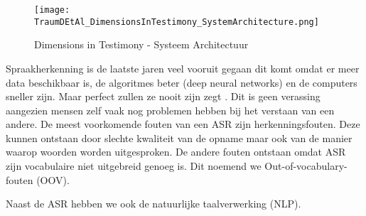 \begin{figure}[h]
    \texttt{[image: TraumDEtAl\_DimensionsInTestimony\_SystemArchitecture.png]}
    \caption{Dimensions in Testimony - Systeem Architectuur \autocite{Traum2015}}
    \label{fig:DiTArchitecture}
\end{figure}

Spraakherkenning is de laatste jaren veel vooruit gegaan dit komt omdat er meer data beschikbaar is, de algoritmes beter (deep neural networks) en de computers sneller zijn. Maar perfect zullen ze nooit zijn zegt \textcite{Hessen2020}. Dit is geen verassing aangezien mensen zelf vaak nog problemen hebben bij het verstaan van een andere. De meest voorkomende fouten van een ASR zijn herkenningsfouten. Deze kunnen ontstaan door slechte kwaliteit van de opname maar ook van de manier waarop woorden worden uitgesproken. De andere fouten ontstaan omdat ASR zijn vocabulaire niet uitgebreid genoeg is. Dit noemend we Out-of-vocabulary-fouten (OOV).

Naast de ASR hebben we ook de natuurlijke taalverwerking (NLP).






%
%
%
%

